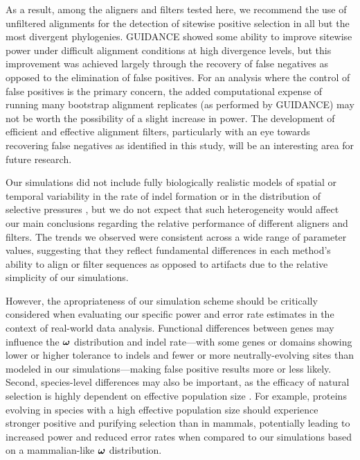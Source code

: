 \documentclass{article}
\begin{document}
As a result, among the aligners and filters tested here, we recommend
the use of unfiltered \prankc alignments for the detection of sitewise
positive selection in all but the most divergent phylogenies. GUIDANCE
showed some ability to improve sitewise power under difficult
alignment conditions at high divergence levels, but this improvement
was achieved largely through the recovery of false negatives as
opposed to the elimination of false positives. For an analysis where
the control of false positives is the primary concern, the added
computational expense of running many bootstrap alignment replicates
(as performed by GUIDANCE) may not be worth the possibility of a
slight increase in power. The development of efficient and effective
alignment filters, particularly with an eye towards recovering false
negatives as identified in this study, will be an interesting area for
future research.

Our simulations did not include fully biologically realistic models of
spatial or temporal variability in the rate of indel formation or in
the distribution of selective pressures \citep{Whelan2008Spatial}, but
we do not expect that such heterogeneity would affect our main
conclusions regarding the relative performance of different aligners
and filters. The trends we observed were consistent across a wide
range of parameter values, suggesting that they reflect fundamental
differences in each method's ability to align or filter sequences as
opposed to artifacts due to the relative simplicity of our
simulations.

However, the apropriateness of our simulation scheme should be
critically considered when evaluating our specific power and error
rate estimates in the context of real-world data analysis. Functional
differences between genes may influence the $\bm{\omega}$ distribution and
indel rate---with some genes or domains showing lower or higher
tolerance to indels and fewer or more neutrally-evolving sites than
modeled in our simulations---making false positive results more or
less likely. Second, species-level differences may also be important,
as the efficacy of natural selection is highly dependent on effective
population size \citep{Ellegren2009Selection}. For example, proteins
evolving in \Dr species with a high effective population size should
experience stronger positive and purifying selection than in mammals,
potentially leading to increased power and reduced error rates when
compared to our simulations based on a mammalian-like $\bm{\omega}$
distribution.
\end{document}
